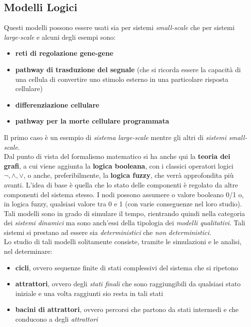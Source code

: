 \documentclass[a4paper,12pt, oneside]{book}
\begin{document}
\subsection{Modelli Logici}
Questi modelli possono essere usati sia per sistemi \textit{small-scale} che per
sistemi \textit{large-scale} e alcuni degli esempi sono:
\begin{itemize}
  \item \textbf{reti di regolazione gene-gene}
  \item \textbf{pathway di trasduzione del segnale} (che si ricorda essere la
  capacità di una cellula di convertire uno stimolo esterno in una particolare
  risposta cellulare) 
  \item \textbf{differenziazione cellulare}
  \item \textbf{pathway per la morte cellulare programmata}
\end{itemize}
Il primo caso è un esempio di \textit{sistema large-scale} mentre gli altri di
\textit{sistemi small-scale}.\\
Dal punto di vista del formalismo matematico si ha anche qui la \textbf{teoria
  dei grafi}, a cui viene aggiunta la \textbf{logica booleana}, con i classici
operatori logici $\neg,\land,\lor$, o anche,
preferibilmente, la \textbf{logica fuzzy}, che verrà approfondita più avanti. L'idea di base è quella che lo stato
delle componenti è regolato da altre componenti del sistema stesso. I nodi
possono assumere o valore booleano 0/1 o, in logica fuzzy, qualsiasi valore tra
0 e 1 (con varie conseguenze nel loro studio).\\
Tali modelli sono in grado di simulare il tempo, rientrando quindi nella
categoria dei \textit{sistemi dinamici} ma sono anch'essi della tipologia dei
\textit{modelli qualitativi}. Tali sistemi si prestano ad essere sia
\textit{deterministici} che \textit{non deterministici}.\\
Lo studio di tali modelli solitamente consiste, tramite le simulazioni e le
analisi, nel determinare:
\begin{itemize}
  \item \textbf{cicli}, ovvero sequenze finite di stati complessivi del sistema
  che si ripetono
  \item \textbf{attrattori}, ovvero degli \textit{stati finali} che sono
  raggiungibili da qualsiasi stato iniziale e una volta raggiunti sio resta in
  tali stati
  \item \textbf{bacini di attrattori}, ovvero percorsi che partono da stati
  intermedi e che conducono a degli \textit{attrattori}
\end{itemize}
\end{document}
